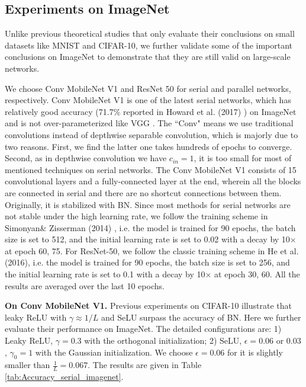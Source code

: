 \documentclass[10pt,journal,compsoc]{IEEEtran}
\begin{document}
 
\vspace{-10pt}
\subsection{Experiments on ImageNet}
Unlike previous theoretical studies \cite{haber2017stable, burkholz2018exact,tarnowski2018dynamical,pennington2017resurrecting,xiao2018dynamical} that only evaluate their conclusions on small datasets like MNIST and CIFAR-10, we further validate some of the important conclusions on ImageNet to demonstrate that they are still valid on large-scale networks.

We choose Conv MobileNet V1\cite{howard2017mobilenets} and ResNet 50 \cite{he2016deep} for serial and parallel networks, respectively. Conv MobileNet V1 is one of the latest serial networks, which has relatively good accuracy (71.7\% reported in Howard et al. (2017) \cite{howard2017mobilenets}) on ImageNet and is not over-parameterized like VGG \cite{simonyan2014very}. The ``Conv" means we use traditional convolutions instead of depthwise separable convolution, which is majorly due to two reasons. First, we find the latter one takes hundreds of epochs to converge. Second, as in depthwise convolution we have $c_{in}=1$, it is too small for most of mentioned techniques on serial networks. The Conv MobileNet V1 consists of 15 convolutional layers and a fully-connected layer at the end, wherein all the blocks are connected in serial and there are no shortcut connections between them. Originally, it is stabilized with BN. Since most methods for serial networks are not stable under the high learning rate, we follow the training scheme in Simonyan\& Zisserman (2014) \cite{simonyan2014very}, i.e. the model is trained for 90 epochs, the batch size is set to 512, and the initial learning rate is set to 0.02 with a decay by 10$\times$ at epoch 60, 75. For ResNet-50, we follow the classic training scheme in He et al. (2016)\cite{he2016deep}, i.e. the model is trained for 90 epochs, the batch size is set to 256, and the initial learning rate is set to 0.1 with a decay by 10$\times$ at epoch 30, 60. All the results are averaged over the last 10 epochs.

\textbf{On Conv MobileNet V1.} Previous experiments on CIFAR-10 illustrate that leaky ReLU with $\gamma\approx 1/L$ and SeLU surpass the accuracy of BN. Here we further evaluate their performance on ImageNet. The detailed configurations are: 1) Leaky ReLU, $\gamma=0.3$ with the orthogonal initialization; 2) SeLU, $\epsilon=0.06$ or $0.03$, $\gamma_0=1$ with the Gaussian initialization. We choose $\epsilon=0.06$ for it is slightly smaller than $\frac{1}{L}=0.067$. The results are given in Table \ref{tab:Accuracy_serial_imagenet}.
\end{document}
